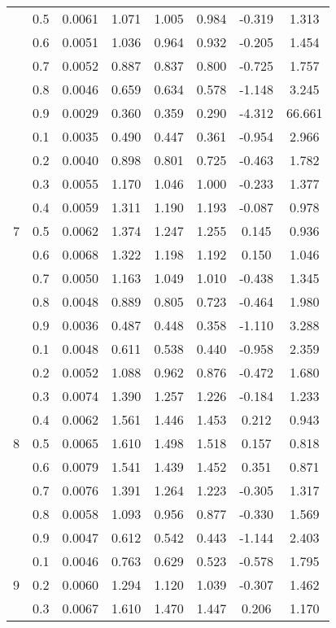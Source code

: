 \documentclass[11pt,a4paper]{report}
\begin{document}
\begin{longtable}{ | c | c || c | c | c | c | c | c | }
 & 0.5 & 0.0061 & 1.071 & 1.005 & 0.984 & -0.319 & 1.313 \\
 & 0.6 & 0.0051 & 1.036 & 0.964 & 0.932 & -0.205 & 1.454 \\
 & 0.7 & 0.0052 & 0.887 & 0.837 & 0.800 & -0.725 & 1.757 \\
 & 0.8 & 0.0046 & 0.659 & 0.634 & 0.578 & -1.148 & 3.245 \\
 & 0.9 & 0.0029 & 0.360 & 0.359 & 0.290 & -4.312 & 66.661 \\
 \hline
\multirow{9}{*}{7} & 0.1 & 0.0035 & 0.490 & 0.447 & 0.361 & -0.954 & 2.966 \\
 & 0.2 & 0.0040 & 0.898 & 0.801 & 0.725 & -0.463 & 1.782 \\
 & 0.3 & 0.0055 & 1.170 & 1.046 & 1.000 & -0.233 & 1.377 \\
 & 0.4 & 0.0059 & 1.311 & 1.190 & 1.193 & -0.087 & 0.978 \\
 & 0.5 & 0.0062 & 1.374 & 1.247 & 1.255 & 0.145 & 0.936 \\
 & 0.6 & 0.0068 & 1.322 & 1.198 & 1.192 & 0.150 & 1.046 \\
 & 0.7 & 0.0050 & 1.163 & 1.049 & 1.010 & -0.438 & 1.345 \\
 & 0.8 & 0.0048 & 0.889 & 0.805 & 0.723 & -0.464 & 1.980 \\
 & 0.9 & 0.0036 & 0.487 & 0.448 & 0.358 & -1.110 & 3.288 \\
 \hline
\multirow{9}{*}{8} & 0.1 & 0.0048 & 0.611 & 0.538 & 0.440 & -0.958 & 2.359 \\
 & 0.2 & 0.0052 & 1.088 & 0.962 & 0.876 & -0.472 & 1.680 \\
 & 0.3 & 0.0074 & 1.390 & 1.257 & 1.226 & -0.184 & 1.233 \\
 & 0.4 & 0.0062 & 1.561 & 1.446 & 1.453 & 0.212 & 0.943 \\
 & 0.5 & 0.0065 & 1.610 & 1.498 & 1.518 & 0.157 & 0.818 \\
 & 0.6 & 0.0079 & 1.541 & 1.439 & 1.452 & 0.351 & 0.871 \\
 & 0.7 & 0.0076 & 1.391 & 1.264 & 1.223 & -0.305 & 1.317 \\
 & 0.8 & 0.0058 & 1.093 & 0.956 & 0.877 & -0.330 & 1.569 \\
 & 0.9 & 0.0047 & 0.612 & 0.542 & 0.443 & -1.144 & 2.403 \\
 \hline
\multirow{9}{*}{9} & 0.1 & 0.0046 & 0.763 & 0.629 & 0.523 & -0.578 & 1.795 \\
 & 0.2 & 0.0060 & 1.294 & 1.120 & 1.039 & -0.307 & 1.462 \\
 & 0.3 & 0.0067 & 1.610 & 1.470 & 1.447 & 0.206 & 1.170 \\

\end{longtable}
\end{document}
